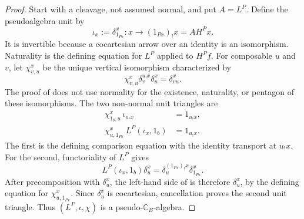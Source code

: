 \documentclass[11pt]{article}
\theoremstyle{plain}
\theoremstyle{definition}
\theoremstyle{remark}
\newcommand{\C}{\mathbb{C}}
\numberwithin{equation}{section}
\begin{document}
\begin{proof}
Start with a cleavage, not assumed normal, and put $A=L^P$.  Define the
pseudoalgebra unit by
\begin{equation}
  \iota_x:=\delta^x_{1_{Px}}\colon x\longrightarrow(1_{Px})_!x
  =AH^Px.
  \label{eq:fixed-base-pseudo-unit}
\end{equation}
It is invertible because a cocartesian arrow over an identity is an
isomorphism.  Naturality is the defining equation for $L^P$ applied to
$H^Pf$.  For composable $u$ and $v$, let $\chi^x_{v,u}$ be the unique
vertical isomorphism characterized by
\begin{equation*}
  \chi^x_{v,u}\delta^{u_!x}_v\delta^x_u=\delta^x_{vu}.
\end{equation*}
The proof of  does not use normality for
the existence, naturality, or pentagon of these isomorphisms.  The two
non-normal unit triangles are
\begin{align}
  \chi^x_{1_b,u}\,\iota_{u_!x}&=1_{u_!x},
  \label{eq:fixed-base-left-unit}\\
  \chi^x_{u,1_{Px}}\,L^P(\iota_x,1_b)&=1_{u_!x}.
  \label{eq:fixed-base-right-unit}
\end{align}
The first is the defining comparison equation with the identity
transport at $u_!x$.  For the second, functoriality of $L^P$ gives
\begin{equation}
  L^P(\iota_x,1_b)\delta^x_u
  =\delta^{(1_{Px})_!x}_u\delta^x_{1_{Px}}.
  \label{eq:fixed-base-right-unit-naturality}
\end{equation}
After precomposition with $\delta^x_u$, the left-hand side of
 is therefore $\delta^x_u$, by the
defining equation for $\chi^x_{u,1_{Px}}$.  Since $\delta^x_u$ is
cocartesian, cancellation proves the second unit triangle.  Thus
$(L^P,\iota,\chi)$ is a pseudo-$\C_B$-algebra.


\end{proof}
\end{document}
